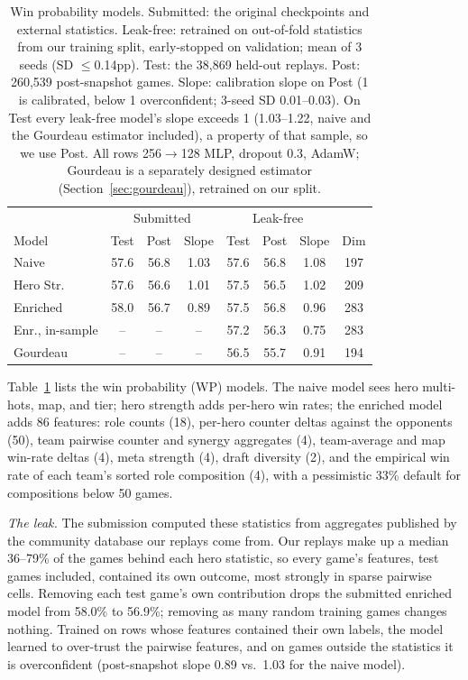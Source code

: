\documentclass[journal]{IEEEtran}
\begin{document}
\begin{table}[t]
\centering
\caption{Win probability models. Submitted: the original checkpoints and external statistics. Leak-free: retrained on out-of-fold statistics from our training split, early-stopped on validation; mean of 3 seeds (SD $\le$0.14pp). Test: the 38,869 held-out replays. Post: 260,539 post-snapshot games. Slope: calibration slope on Post (1 is calibrated, below 1 overconfident; 3-seed SD 0.01--0.03). On Test every leak-free model's slope exceeds 1 (1.03--1.22, naive and the Gourdeau estimator included), a property of that sample, so we use Post. All rows 256$\to$128 MLP, dropout 0.3, AdamW; Gourdeau is a separately designed estimator (Section~\ref{sec:gourdeau}), retrained on our split.}
\label{tab:models}
\setlength{\tabcolsep}{3.4pt}
\begin{tabular}{lccc|ccc|c}
\toprule
& \multicolumn{3}{c|}{Submitted} & \multicolumn{3}{c|}{Leak-free} & \\
Model & Test & Post & Slope & Test & Post & Slope & Dim \\
\midrule
Naive & 57.6 & 56.8 & 1.03 & 57.6 & 56.8 & 1.08 & 197 \\
Hero Str. & 57.6 & 56.6 & 1.01 & 57.5 & 56.5 & 1.02 & 209 \\
Enriched & 58.0 & 56.7 & 0.89 & 57.5 & 56.8 & 0.96 & 283 \\
Enr., in-sample & -- & -- & -- & 57.2 & 56.3 & 0.75 & 283 \\
Gourdeau & -- & -- & -- & 56.5 & 55.7 & 0.91 & 194 \\
\bottomrule
\end{tabular}
\end{table}

Table~\ref{tab:models} lists the win probability (WP) models. The naive model sees hero multi-hots, map, and tier; hero strength adds per-hero win rates; the enriched model adds 86 features: role counts (18), per-hero counter deltas against the opponents (50), team pairwise counter and synergy aggregates (4), team-average and map win-rate deltas (4), meta strength (4), draft diversity (2), and the empirical win rate of each team's sorted role composition (4), with a pessimistic 33\% default for compositions below 50 games.

\textit{The leak.} The submission computed these statistics from aggregates published by the community database our replays come from. Our replays make up a median 36--79\% of the games behind each hero statistic, so every game's features, test games included, contained its own outcome, most strongly in sparse pairwise cells. Removing each test game's own contribution drops the submitted enriched model from 58.0\% to 56.9\%; removing as many random training games changes nothing. Trained on rows whose features contained their own labels, the model learned to over-trust the pairwise features, and on games outside the statistics it is overconfident (post-snapshot slope 0.89 vs.\ 1.03 for the naive model).
\end{document}
